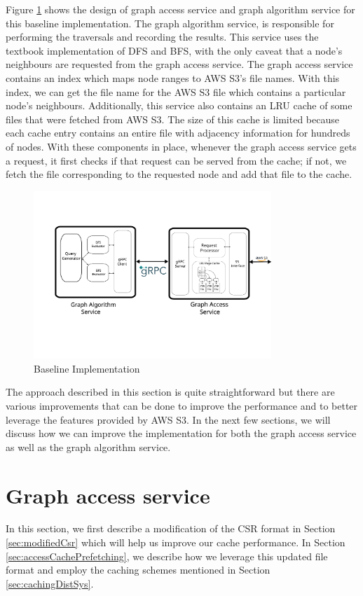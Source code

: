 \medskip
Figure \ref{fig:baselineImpl} shows the design of graph access service and graph
algorithm service for this baseline implementation. The graph algorithm service,
is responsible for performing the traversals and recording the results. This
service uses the textbook implementation of DFS and BFS, with the only caveat
that a node's neighbours are requested from the graph access service. The graph
access service contains an index which maps node ranges to AWS S3's file names. With
this index, we can get the file name for the AWS S3 file which contains a particular
node's neighbours. Additionally, this service also contains an LRU cache of some
files that were fetched from AWS S3. The size of this cache is limited because each
cache entry contains an entire file with adjacency information for
hundreds of nodes. With these components in place, whenever the graph access
service gets a request, it first checks if that request can be served from the
cache; if not, we fetch the file corresponding to the requested node and add
that file to the cache.
\begin{figure}[ht]
    \centering
    \includegraphics[width=0.8\textwidth]{figures/baseline.png}
    \caption{Baseline Implementation}
    \label{fig:baselineImpl}
\end{figure}

\medskip
The approach described in this section is quite straightforward but there are
various improvements that can be done to improve the performance and to better 
leverage the features provided by AWS S3. In the next few sections, we will
discuss how we can improve the implementation for both the graph access service
as well as the graph algorithm service. 

\section{Graph access service}\label{sec:graphAccess}
In this section, we first describe a modification of the CSR format in
Section \ref{sec:modifiedCsr} which will help us improve our cache performance.
In Section \ref{sec:accessCachePrefetching}, we describe how we leverage
this updated file format and employ the caching schemes mentioned in
Section \ref{sec:cachingDistSys}.

